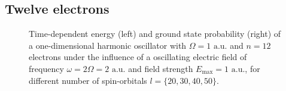 \vfill
\pagebreak

\subsection*{Twelve electrons}

\begin{figure}[!h]
    \centering
    \caption{Time-dependent energy (left) and ground state probability (right)
        of a one-dimensional harmonic oscillator with $\Omega=1 \text{ a.u.}$
        and $n=12$ electrons under the influence of a oscillating electric field 
        of frequency $\omega = 2 \Omega = 2 \text{ a.u.}$ and field strength
        $E_\text{max}=1 \text{ a.u.}$,
        for different number of spin-orbitals $l=\{20,30,40,50\}$.
    }
    \label{fig:1d_n12_qd}
\end{figure}

